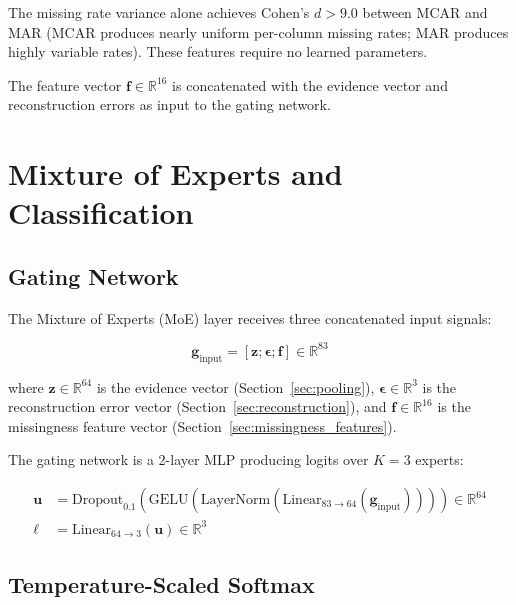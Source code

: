 \documentclass[11pt]{article}
\newcommand{\RR}{\mathbb{R}}
\newcommand{\layernorm}{\text{LayerNorm}}
\newcommand{\gelu}{\text{GELU}}
\begin{document}
The missing rate variance alone achieves Cohen's $d > 9.0$ between MCAR and MAR (MCAR produces nearly uniform per-column missing rates; MAR produces highly variable rates). These features require no learned parameters.

The feature vector $\mathbf{f} \in \RR^{16}$ is concatenated with the evidence vector and reconstruction errors as input to the gating network.

\section{Mixture of Experts and Classification}
\label{sec:moe}

\subsection{Gating Network}

The Mixture of Experts (MoE) layer receives three concatenated input signals:

\begin{equation}
\mathbf{g}_{\text{input}} = [\mathbf{z}; \bm{\epsilon}; \mathbf{f}] \in \RR^{83}
\label{eq:gate_input}
\end{equation}

where $\mathbf{z} \in \RR^{64}$ is the evidence vector (Section~\ref{sec:pooling}), $\bm{\epsilon} \in \RR^{3}$ is the reconstruction error vector (Section~\ref{sec:reconstruction}), and $\mathbf{f} \in \RR^{16}$ is the missingness feature vector (Section~\ref{sec:missingness_features}).

The gating network is a 2-layer MLP producing logits over $K = 3$ experts:

\begin{align}
\mathbf{u} &= \text{Dropout}_{0.1}\!\left(\gelu\!\left(\layernorm\!\left(\text{Linear}_{83 \to 64}(\mathbf{g}_{\text{input}})\right)\right)\right) \in \RR^{64} \label{eq:gate_hidden} \\
\bm{\ell} &= \text{Linear}_{64 \to 3}(\mathbf{u}) \in \RR^{3} \label{eq:gate_logits}
\end{align}

\subsection{Temperature-Scaled Softmax}
\end{document}
